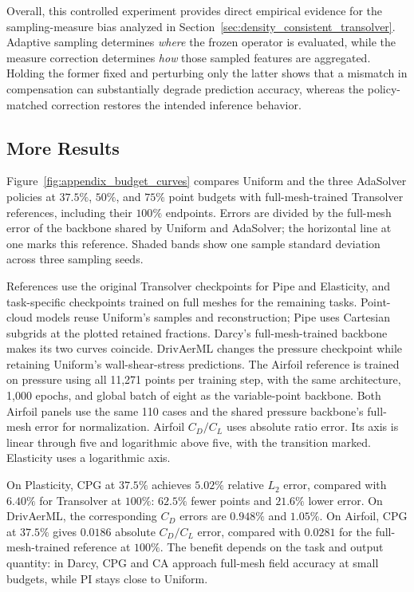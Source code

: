 \documentclass{article}
\providecommand{\DIFaddbegin}{} %
\providecommand{\DIFaddend}{} %
\newcommand{\DIFaddincludegraphics}[2][]{{\color{blue}\fbox{\DIFOincludegraphics[#1]{#2}}}} %
\DeclareRobustCommand{\DIFaddbegin}{\DIFOaddbegin \let\includegraphics\DIFaddincludegraphics} %
\DeclareRobustCommand{\DIFaddend}{\DIFOaddend \let\includegraphics\DIFOincludegraphics} %
\renewcommand{\DIFaddincludegraphics}[2][]{%
  \begingroup
  \sbox{\DIFdelgraphicsbox}{\DIFOincludegraphics[#1]{#2}}%
  \setlength{\fboxsep}{0pt}\setlength{\fboxrule}{0.8pt}%
  {\color{blue}\fbox{\resizebox{\dimexpr\wd\DIFdelgraphicsbox-2\fboxrule\relax}{!}{\usebox{\DIFdelgraphicsbox}}}}%
  \endgroup
}
\begin{document}
Overall, this controlled experiment provides direct empirical evidence
for the sampling-measure bias analyzed in
Section~\ref{sec:density_consistent_transolver}. Adaptive sampling
determines \emph{where} the frozen operator is evaluated, while the
measure correction determines \emph{how} those sampled features are
aggregated. Holding the former fixed and perturbing only the latter
shows that a mismatch in compensation can substantially degrade
prediction accuracy, whereas the policy-matched correction restores the
intended inference behavior.
\DIFaddbegin 

\DIFaddend \clearpage

\subsection{More Results}
\label{app:budget_curves}

Figure~\ref{fig:appendix_budget_curves} compares Uniform and the three
AdaSolver policies at $37.5\%$, $50\%$, and $75\%$ point budgets with
full-mesh-trained Transolver references, including their $100\%$ endpoints.
Errors are divided by the full-mesh error of the backbone shared by Uniform
and AdaSolver; the horizontal line at one marks this reference. Shaded bands
show one sample standard deviation across three sampling seeds.

References use the original Transolver checkpoints for Pipe and Elasticity,
and task-specific checkpoints trained on full meshes for the remaining
tasks. Point-cloud models reuse Uniform's
samples and reconstruction; Pipe uses Cartesian subgrids at the plotted
retained fractions. Darcy's full-mesh-trained backbone makes its two curves
coincide. DrivAerML changes the pressure checkpoint while retaining Uniform's
wall-shear-stress predictions. The Airfoil reference is trained on pressure
using all 11,271 points per training step, with the same architecture,
1,000 epochs, and global batch of eight as the variable-point backbone.
Both Airfoil panels use the same 110 cases and the shared pressure backbone's
full-mesh error for normalization. Airfoil $C_D/C_L$ uses absolute ratio error.
Its axis is linear through five and logarithmic above five, with the
transition marked. Elasticity uses a logarithmic axis.

On Plasticity, CPG at
$37.5\%$ achieves $5.02\%$ relative $L_2$ error, compared with $6.40\%$ for
Transolver at $100\%$: $62.5\%$ fewer points and $21.6\%$ lower error.
On DrivAerML, the corresponding $C_D$ errors are $0.948\%$ and $1.05\%$.
On Airfoil, CPG at $37.5\%$ gives $0.0186$ absolute $C_D/C_L$ error,
compared with $0.0281$ for the full-mesh-trained reference at $100\%$.
The benefit depends on the task and output quantity: in Darcy, CPG and CA
approach full-mesh field accuracy at small budgets, while PI stays close to
Uniform.
\end{document}
